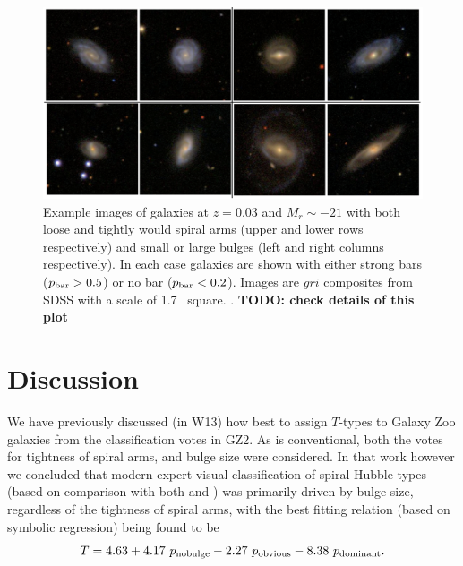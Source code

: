 \documentclass[usenatbib]{mn2e}
\newcommand{\be}{\begin{equation}}
\newcommand{\ee}{\end{equation}}
\begin{document}
 \begin{figure}
\center
\includegraphics[width=160mm]{examplebulgewinding2.png}
\caption{Example images of galaxies at $z=0.03$ and $M_r\sim -21$ with both loose and tightly would spiral arms (upper and lower rows respectively) and small or large bulges (left and right columns respectively). In each case galaxies are shown with either strong bars ($p_{\rm bar}>0.5$) or no bar ($p_{\rm bar} < 0.2$). Images are $gri$ composites from SDSS with a scale of 1.7\arcmin~ square.  \label{windingexample}. {\bf TODO: check details of this plot}}
\end{figure}
 
\section{Discussion} \label{discussion}

 
 We have previously discussed (in W13) how best to assign $T$-types to Galaxy Zoo galaxies from the classification votes in GZ2. As is conventional, both the votes for tightness of spiral arms, and bulge size were considered. In that work however we concluded that modern expert visual classification of spiral Hubble types (based on comparison with both \citet[hereafter NA10]{Nair2010a} and \citet{EFIGI}) was primarily driven by bulge size, regardless of the tightness of spiral arms, with the best fitting relation (based on symbolic regression) being found to be
 \be
 T = 4.63 + 4.17~p_{\rm no bulge} - 2.27~p_{\rm obvious} - 8.38~p_{\rm dominant}. 
 \ee 
 
\end{document}
